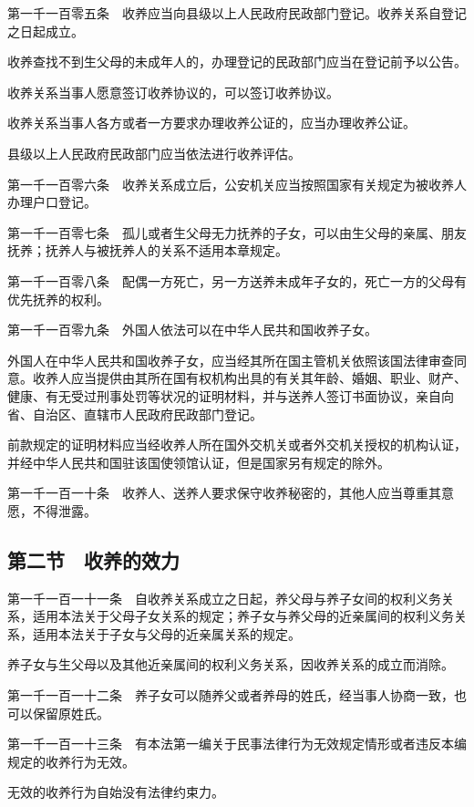 \documentclass[UTF8,12pt,a4paper]{ctexbook}
\begin{document}
第一千一百零五条　收养应当向县级以上人民政府民政部门登记。收养关系自登记之日起成立。

收养查找不到生父母的未成年人的，办理登记的民政部门应当在登记前予以公告。

收养关系当事人愿意签订收养协议的，可以签订收养协议。

收养关系当事人各方或者一方要求办理收养公证的，应当办理收养公证。

县级以上人民政府民政部门应当依法进行收养评估。

第一千一百零六条　收养关系成立后，公安机关应当按照国家有关规定为被收养人办理户口登记。

第一千一百零七条　孤儿或者生父母无力抚养的子女，可以由生父母的亲属、朋友抚养；抚养人与被抚养人的关系不适用本章规定。

第一千一百零八条　配偶一方死亡，另一方送养未成年子女的，死亡一方的父母有优先抚养的权利。

第一千一百零九条　外国人依法可以在中华人民共和国收养子女。

外国人在中华人民共和国收养子女，应当经其所在国主管机关依照该国法律审查同意。收养人应当提供由其所在国有权机构出具的有关其年龄、婚姻、职业、财产、健康、有无受过刑事处罚等状况的证明材料，并与送养人签订书面协议，亲自向省、自治区、直辖市人民政府民政部门登记。

前款规定的证明材料应当经收养人所在国外交机关或者外交机关授权的机构认证，并经中华人民共和国驻该国使领馆认证，但是国家另有规定的除外。

第一千一百一十条　收养人、送养人要求保守收养秘密的，其他人应当尊重其意愿，不得泄露。

\subsection*{第二节　收养的效力}

第一千一百一十一条　自收养关系成立之日起，养父母与养子女间的权利义务关系，适用本法关于父母子女关系的规定；养子女与养父母的近亲属间的权利义务关系，适用本法关于子女与父母的近亲属关系的规定。

养子女与生父母以及其他近亲属间的权利义务关系，因收养关系的成立而消除。

第一千一百一十二条　养子女可以随养父或者养母的姓氏，经当事人协商一致，也可以保留原姓氏。

第一千一百一十三条　有本法第一编关于民事法律行为无效规定情形或者违反本编规定的收养行为无效。

无效的收养行为自始没有法律约束力。
\end{document}

